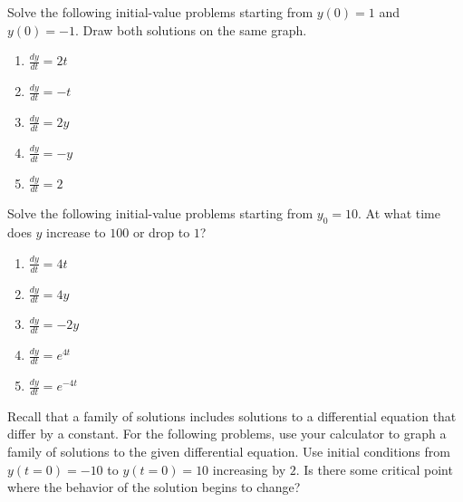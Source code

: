 \documentclass{exercises}
\begin{document}
Solve the following initial-value problems starting from $y(0)=1$ and $y(0)=-1$. Draw both solutions on the same graph.

\begin{enumerate}[resume]
\item $\frac{dy}{dt}=2t$
\item $\frac{dy}{dt}=-t$
\item $\frac{dy}{dt}=2y$
\item $\frac{dy}{dt}=-y$
\item $\frac{dy}{dt}=2$
\end{enumerate}

Solve the following initial-value problems starting from $y_{0}=10$. At what time does $y$ increase to $100$ or drop to $1$?

\begin{enumerate}[resume]
\item $\frac{dy}{dt}=4t$
\item $\frac{dy}{dt}=4y$
\item $\frac{dy}{dt}=-2y$
\item $\frac{dy}{dt}=e^{4t}$
\item $\frac{dy}{dt}=e^{-4t}$
\end{enumerate}

Recall that a family of solutions includes solutions to a differential equation that differ by a constant. For the following problems, use your calculator to graph a family of solutions to the given differential equation. Use initial conditions from $y(t=0)=-10$ to $y(t=0)=10$ increasing by $2$. Is there some critical point where the behavior of the solution begins to change?
\end{document}
